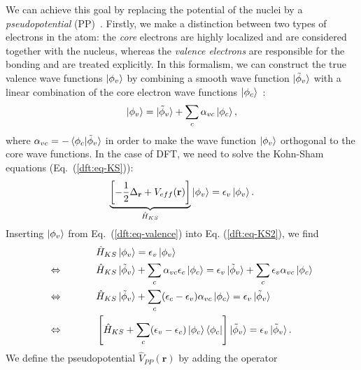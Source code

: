 \begin{refsection}
We can achieve this goal by replacing the potential of the nuclei by a 
\textit{pseudopotential} (\gls{PP})~\cite{Phillips1959}. Firstly, we make a 
distinction between two types of electrons in the atom: the \textit{core} 
electrons are highly localized and are considered together with the nucleus, 
whereas the \textit{valence electrons} are responsible for the bonding and are 
treated explicitly. In this formalism, we can construct the true valence wave 
functions $\ket{\phi_v}$ by combining a smooth wave function 
$\ket{\tilde{\phi}_v}$ with a linear combination of the core electron wave 
functions $\ket{\phi_c}$~\cite{Kohanoff2006}: 
\begin{equation} \label{dft:eq-valence}
\ket{\phi_v} = \ket{\tilde{\phi}_v} + \sum_c \alpha_{vc} \ket{\phi_c},  
\end{equation} 
where $\alpha_{vc} = - \braket{\phi_c | \tilde{\phi}_v}$ in order to make the 
wave function $\ket{\phi_v}$ orthogonal to the core wave functions. In the 
case of \gls{DFT}, we need to solve the Kohn-Sham equations (Eq.~(\ref{dft:eq-KS})): 
\begin{equation}\label{dft:eq-KS2} 
\underbrace{\left[- \frac{1}{2} \Delta_{\mathbf{r}} + V_{eff}(\mathbf{r}) 
\right]}_{\hat{H}_{KS} } \ket{\phi_v} = \epsilon_v \ket{\phi_v}. 
\end{equation} 
Inserting $\ket{\phi_v}$ from Eq.~(\ref{dft:eq-valence}) into Eq. (\ref{dft:eq-KS2}), we find 
\begin{align*} 
&\hspace{0.5in}\hat{H}_{KS} \ket{\phi_v} = \epsilon_v \ket{\phi_v}  
\\ \Leftrightarrow &\hspace{0.5in} \hat{H}_{KS} \ket{\tilde{\phi}_v} + \sum_c 
\alpha_{vc} \epsilon_c \ket{\phi_c} = \epsilon_v \ket{\tilde{\phi}_v} +  
\sum_c \epsilon_v \alpha_{vc}  \ket{\phi_c} 
\\ \Leftrightarrow &\hspace{0.5in} \hat{H}_{KS} \ket{\tilde{\phi}_v} + \sum_c 
(\epsilon_c - \epsilon_v) \alpha_{vc}  \ket{\phi_c} = \epsilon_v 
\ket{\tilde{\phi}_v} 
\\ \Leftrightarrow &\hspace{0.5in} \left[ \hat{H}_{KS} + \sum_c (\epsilon_v - 
\epsilon_c) \ket{\phi_c} \bra{\phi_c} \right] \ket{\tilde{\phi}_v} = 
\epsilon_v \ket{\tilde{\phi}_v}. 
\end{align*} 
We define the pseudopotential $\hat{V}_{PP}(\mathbf{r})$ by adding the 
operator 
\begin{equation*} 

\end{equation*}
\end{refsection}
